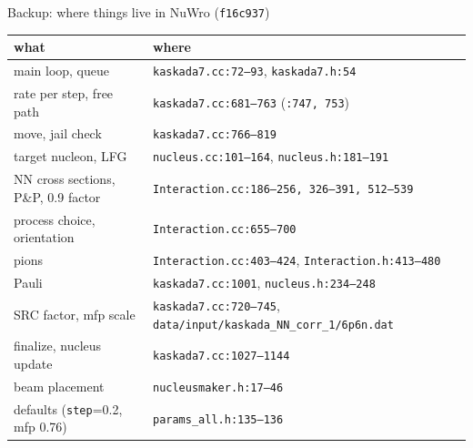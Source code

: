 \documentclass[10pt,aspectratio=169]{beamer}
\newcommand{\code}[1]{{\small\texttt{#1}}}
\begin{document}
\appendix
\begin{frame}{Backup: where things live in NuWro (\texttt{f16c937})}
\small
\begin{tabular}{ll}
\toprule
what & where\\
\midrule
main loop, queue & \code{kaskada7.cc:72--93}, \code{kaskada7.h:54}\\
rate per step, free path & \code{kaskada7.cc:681--763} (\code{:747, 753})\\
move, jail check & \code{kaskada7.cc:766--819}\\
target nucleon, LFG & \code{nucleus.cc:101--164}, \code{nucleus.h:181--191}\\
NN cross sections, P\&P, 0.9 factor & \code{Interaction.cc:186--256, 326--391, 512--539}\\
process choice, orientation & \code{Interaction.cc:655--700}\\
pions & \code{Interaction.cc:403--424}, \code{Interaction.h:413--480}\\
Pauli & \code{kaskada7.cc:1001}, \code{nucleus.h:234--248}\\
SRC factor, mfp scale & \code{kaskada7.cc:720--745}, \code{data/input/kaskada\_NN\_corr\_1/6p6n.dat}\\
finalize, nucleus update & \code{kaskada7.cc:1027--1144}\\
beam placement & \code{nucleusmaker.h:17--46}\\
defaults (\code{step}=0.2, mfp 0.76) & \code{params\_all.h:135--136}\\
\bottomrule
\end{tabular}
\end{frame}
\end{document}
